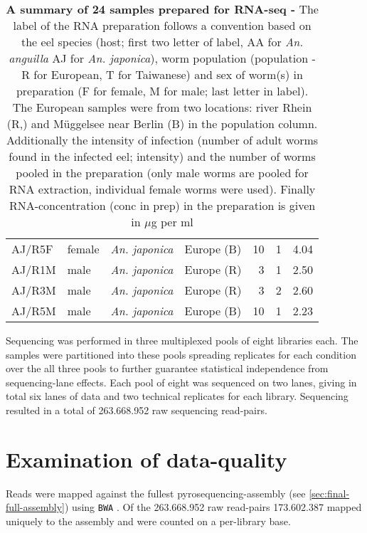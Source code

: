 \begin{table}[h]
\begin{center}
\begin{tabular}{llllrrr}
  AJ/R5F & female & \textit{An. japonica} & Europe (B) & 10 & 1 & 4.04 \\ 
  AJ/R1M & male & \textit{An. japonica} & Europe (R) & 3 & 1 & 2.50 \\ 
  AJ/R3M & male & \textit{An. japonica} & Europe (R) & 3 & 2 & 2.60 \\ 
  AJ/R5M & male & \textit{An. japonica} & Europe (B) & 10 & 1 & 2.23 \\ 
   \hline
\end{tabular}
\caption[Summary of RNA preparation]{\textbf{A summary of 24 samples
    prepared for RNA-seq -} The label of the RNA preparation follows a
  convention based on the eel species (host; first two letter of
  label, AA for \textit{An. anguilla} AJ for \textit{An. japonica}),
  worm population (population - R for European, T for Taiwanese) and
  sex of worm(s) in preparation (F for female, M for male; last letter
  in label). The European samples were from two locations: river Rhein
  (R,) and Müggelsee near Berlin (B) in the population
  column. Additionally the intensity of infection (number of adult
  worms found in the infected eel; intensity) and the number of worms
  pooled in the preparation (only male worms are pooled for RNA
  extraction, individual female worms were used). Finally
  RNA-concentration (conc in prep) in the preparation is given in
  $\mu$g per ml}
\label{tab:lib-prep}
\end{center}
\end{table}


Sequencing was performed in three multiplexed pools of eight libraries
each. The samples were partitioned into these pools spreading
replicates for each condition over the all three pools to further
guarantee statistical independence from sequencing-lane effects. Each
pool of eight was sequenced on two lanes, giving in total six lanes of
data and two technical replicates for each library. Sequencing
resulted in a total of 263.668.952 raw sequencing read-pairs.

\section{Examination of data-quality}

Reads were mapped against the fullest pyrosequencing-assembly (see
\ref{sec:final-full-assembly}) using \texttt{BWA}
\cite{pmid20080505}. Of the 263.668.952 raw read-pairs 173.602.387
mapped uniquely to the assembly and were counted on a per-library
base. 

